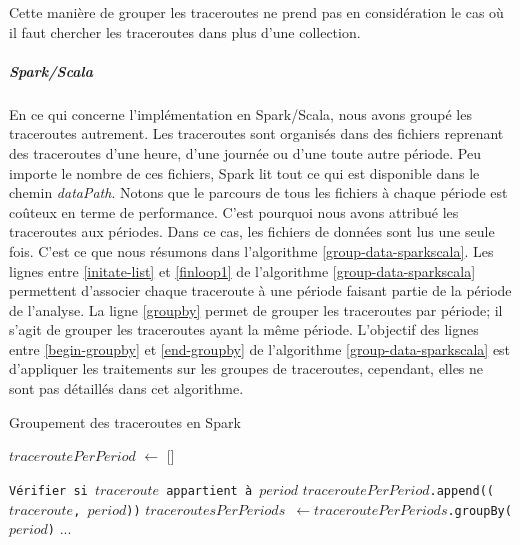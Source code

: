 Cette manière de grouper les traceroutes ne prend pas en considération le cas où
il faut chercher les traceroutes dans plus d'une collection.

\subparagraph{Spark/Scala} En ce qui concerne l'implémentation en Spark/Scala,
 nous avons groupé les traceroutes autrement. 
 Les traceroutes sont organisés dans des fichiers reprenant des traceroutes d'une heure, d'une journée ou d'une toute autre période.  Peu importe le nombre de ces fichiers, Spark lit tout ce qui est disponible dans le chemin \textit{dataPath}. 
 Notons que le  parcours de tous les fichiers à chaque  période est coûteux en terme de performance.
  C'est pourquoi nous avons attribué les traceroutes aux périodes. Dans ce cas, les fichiers de données sont lus une seule fois. C'est ce que nous résumons dans l'algorithme \ref{group-data-sparkscala}. Les lignes entre \ref{initate-list} et \ref{finloop1} de l'algorithme \ref{group-data-sparkscala} permettent d'associer chaque traceroute à une période faisant partie de la période de l'analyse. La ligne  \ref{groupby} permet de grouper les traceroutes par période; il s'agit de grouper les traceroutes ayant la même période. L'objectif des lignes entre \ref{begin-groupby} et \ref{end-groupby}  de l'algorithme \ref{group-data-sparkscala} est d'appliquer les traitements sur les groupes de traceroutes, cependant, elles ne sont pas détaillés dans cet algorithme. 
  

\begin{algorithm}[H]
	\caption{Groupement des traceroutes en Spark}
	\label{group-data-sparkscala}
	\begin{algorithmic}[1]
    \State $ traceroutePerPeriod $  $\gets$ [] \label{initate-list}
	
			\State \texttt{Vérifier si  $traceroute$ appartient à  $period$}
		\EndFor
		\State \texttt{$ traceroutePerPeriod $.append(($ traceroute $, $period$))}
	\EndFor  \label{finloop1}
	\State \texttt{$ traceroutesPerPeriods $ $\gets$$ traceroutePerPeriods $.groupBy($period$)} \label{groupby}
	\label{begin-groupby}
	\State ... 
	\EndFor \label{end-groupby}

\end{algorithmic}
\end{algorithm}

